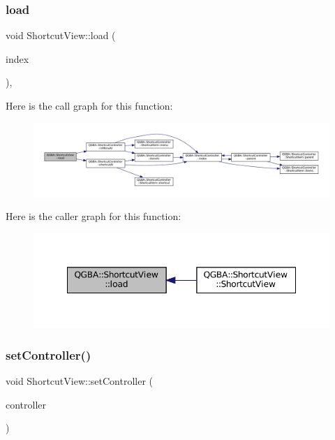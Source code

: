 \subsubsection{\texorpdfstring{load}{load}}
{\footnotesize\ttfamily void Shortcut\+View\+::load (\begin{DoxyParamCaption}\item[{const Q\+Model\+Index \&}]{index }\end{DoxyParamCaption})\hspace{0.3cm}{\ttfamily [private]}, {\ttfamily [slot]}}

Here is the call graph for this function\+:
\nopagebreak
\begin{figure}[H]
\begin{center}
\leavevmode
\includegraphics[width=350pt]{class_q_g_b_a_1_1_shortcut_view_ae57eea13c43f836bff537d70a50ffc90_cgraph}
\end{center}
\end{figure}
Here is the caller graph for this function\+:
\nopagebreak
\begin{figure}[H]
\begin{center}
\leavevmode
\includegraphics[width=348pt]{class_q_g_b_a_1_1_shortcut_view_ae57eea13c43f836bff537d70a50ffc90_icgraph}
\end{center}
\end{figure}
\mbox{\label{class_q_g_b_a_1_1_shortcut_view_ac69c7db087732d1795178c39f094ff93}} 
\subsubsection{\texorpdfstring{set\+Controller()}{setController()}}
{\footnotesize\ttfamily void Shortcut\+View\+::set\+Controller (\begin{DoxyParamCaption}\item[{\mbox{\hyperlink{class_q_g_b_a_1_1_shortcut_controller}{Shortcut\+Controller}} $\ast$}]{controller }\end{DoxyParamCaption})}

